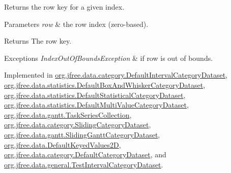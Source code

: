 Returns the row key for a given index.


\begin{DoxyParams}{Parameters}
{\em row} & the row index (zero-\/based).\\
\hline
\end{DoxyParams}
\begin{DoxyReturn}{Returns}
The row key.
\end{DoxyReturn}

\begin{DoxyExceptions}{Exceptions}
{\em Index\+Out\+Of\+Bounds\+Exception} & if {\ttfamily row} is out of bounds. \\
\hline
\end{DoxyExceptions}


Implemented in \mbox{\hyperlink{classorg_1_1jfree_1_1data_1_1category_1_1_default_interval_category_dataset_a43d43fb85d81f77ce7737d381c91b8b3}{org.\+jfree.\+data.\+category.\+Default\+Interval\+Category\+Dataset}}, \mbox{\hyperlink{classorg_1_1jfree_1_1data_1_1statistics_1_1_default_box_and_whisker_category_dataset_a7433281da93ea1c231c3d134c3c86aa9}{org.\+jfree.\+data.\+statistics.\+Default\+Box\+And\+Whisker\+Category\+Dataset}}, \mbox{\hyperlink{classorg_1_1jfree_1_1data_1_1statistics_1_1_default_statistical_category_dataset_a3d1639e32ea6605c35735de8e89486f8}{org.\+jfree.\+data.\+statistics.\+Default\+Statistical\+Category\+Dataset}}, \mbox{\hyperlink{classorg_1_1jfree_1_1data_1_1statistics_1_1_default_multi_value_category_dataset_a0dcf3b92e34fabc4322b887c083e790a}{org.\+jfree.\+data.\+statistics.\+Default\+Multi\+Value\+Category\+Dataset}}, \mbox{\hyperlink{classorg_1_1jfree_1_1data_1_1gantt_1_1_task_series_collection_adf6c7e868a48a871bfec44f2a14a00e9}{org.\+jfree.\+data.\+gantt.\+Task\+Series\+Collection}}, \mbox{\hyperlink{classorg_1_1jfree_1_1data_1_1category_1_1_sliding_category_dataset_a6fcf1e054f8df00a8d37ea3b6eb0960a}{org.\+jfree.\+data.\+category.\+Sliding\+Category\+Dataset}}, \mbox{\hyperlink{classorg_1_1jfree_1_1data_1_1gantt_1_1_sliding_gantt_category_dataset_abb1a58ac4db1497c2874e7a10e0f2026}{org.\+jfree.\+data.\+gantt.\+Sliding\+Gantt\+Category\+Dataset}}, \mbox{\hyperlink{classorg_1_1jfree_1_1data_1_1_default_keyed_values2_d_ada2ab1693bba62c0f8a8d5e046614b59}{org.\+jfree.\+data.\+Default\+Keyed\+Values2D}}, \mbox{\hyperlink{classorg_1_1jfree_1_1data_1_1category_1_1_default_category_dataset_a8828cdefd54d499565516fa42d44f89a}{org.\+jfree.\+data.\+category.\+Default\+Category\+Dataset}}, and \mbox{\hyperlink{classorg_1_1jfree_1_1data_1_1general_1_1_test_interval_category_dataset_af8d67eac5f22766176eba84d80614940}{org.\+jfree.\+data.\+general.\+Test\+Interval\+Category\+Dataset}}.

